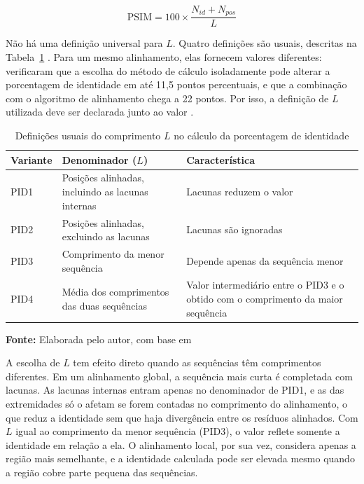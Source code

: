 \begin{equation}
	\mathrm{PSIM} = 100 \times \frac{N_{id} + N_{pos}}{L}
	\label{eq:psim}
\end{equation}

Não há uma definição universal para $L$. Quatro definições são usuais, descritas na Tabela~\ref{tab:pid} \cite{May2004, Raghava2006}. Para um mesmo alinhamento, elas fornecem valores diferentes:  verificaram que a escolha do método de cálculo isoladamente pode alterar a porcentagem de identidade em até 11,5 pontos percentuais, e que a combinação com o algoritmo de alinhamento chega a 22 pontos. Por isso, a definição de $L$ utilizada deve ser declarada junto ao valor \cite{May2004, Raghava2006}.

\FloatBarrier
\begin{table}[!htbp]
	\centering
	\SingleSpacing\small
	\caption{Definições usuais do comprimento $L$ no cálculo da porcentagem de identidade}
	\begin{tabularx}{\textwidth}{@{}lXX@{}}
		\toprule
		\textbf{Variante} & \textbf{Denominador ($L$)} & \textbf{Característica} \\
		\midrule
		PID1 & Posições alinhadas, incluindo as lacunas internas & Lacunas reduzem o valor \\
		PID2 & Posições alinhadas, excluindo as lacunas          & Lacunas são ignoradas \\
		PID3 & Comprimento da menor sequência                    & Depende apenas da sequência menor \\
		PID4 & Média dos comprimentos das duas sequências        & Valor intermediário entre o PID3 e o obtido com o comprimento da maior sequência \\
		\bottomrule
	\end{tabularx}
	\par\vspace{0.2cm}
	\textbf{Fonte:} Elaborada pelo autor, com base em 
	\label{tab:pid}
\end{table}
\FloatBarrier

A escolha de $L$ tem efeito direto quando as sequências têm comprimentos diferentes. Em um alinhamento global, a sequência mais curta é completada com lacunas. As lacunas internas entram apenas no denominador de PID1, e as das extremidades só o afetam se forem contadas no comprimento do alinhamento, o que reduz a identidade sem que haja divergência entre os resíduos alinhados. Com $L$ igual ao comprimento da menor sequência (PID3), o valor reflete somente a identidade em relação a ela. O alinhamento local, por sua vez, considera apenas a região mais semelhante, e a identidade calculada pode ser elevada mesmo quando a região cobre parte pequena das sequências.


